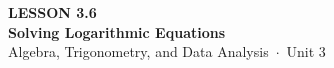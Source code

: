 \documentclass[aspectratio=169, 11pt]{beamer}
\begin{document}
{
\begin{frame}[plain]
  \vspace{2.8cm}\hspace{0.55cm}%
  \begin{minipage}{0.9\textwidth}
    {\color{goldacc}\bfseries\small LESSON 3.6}\\[0.5cm]
    {\color{white}\bfseries\LARGE Solving Logarithmic Equations}\\[1.2cm]
    {\color{mistmid}\small Algebra, Trigonometry, and Data Analysis~$\cdot$~Unit 3}
  \end{minipage}
\end{frame}
}

\begin{frame}[t, plain]
\end{frame}
\end{document}
